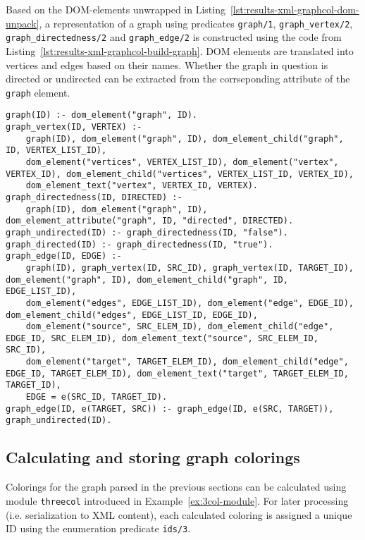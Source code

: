 Based on the DOM-elements unwrapped in Listing~\ref{lst:results-xml-graphcol-dom-unpack}, a representation of a graph using predicates \texttt{graph/1}, \texttt{graph\_vertex/2}, \texttt{graph\_directedness/2} and \texttt{graph\_edge/2} is constructed using the code from Listing~\ref{lst:results-xml-graphcol-build-graph}. DOM elements are translated into vertices and edges based on their names. Whether the graph in question is directed or undirected can be extracted from the corrseponding attribute of the \texttt{graph} element.

\begin{lstlisting}[style=asp-code, label={lst:results-xml-graphcol-build-graph}, caption={Constructing a graph representation from parsed XML data.}]
% Translate generic DOM-elements into graphs
graph(ID) :- dom_element("graph", ID).
graph_vertex(ID, VERTEX) :- 
    graph(ID), dom_element("graph", ID), dom_element_child("graph", ID, VERTEX_LIST_ID), 
    dom_element("vertices", VERTEX_LIST_ID), dom_element("vertex", VERTEX_ID), dom_element_child("vertices", VERTEX_LIST_ID, VERTEX_ID),
    dom_element_text("vertex", VERTEX_ID, VERTEX).
graph_directedness(ID, DIRECTED) :- 
    graph(ID), dom_element("graph", ID), dom_element_attribute("graph", ID, "directed", DIRECTED).
graph_undirected(ID) :- graph_directedness(ID, "false").
graph_directed(ID) :- graph_directedness(ID, "true").
graph_edge(ID, EDGE) :- 
    graph(ID), graph_vertex(ID, SRC_ID), graph_vertex(ID, TARGET_ID), dom_element("graph", ID), dom_element_child("graph", ID, EDGE_LIST_ID), 
    dom_element("edges", EDGE_LIST_ID), dom_element("edge", EDGE_ID), dom_element_child("edges", EDGE_LIST_ID, EDGE_ID),
    dom_element("source", SRC_ELEM_ID), dom_element_child("edge", EDGE_ID, SRC_ELEM_ID), dom_element_text("source", SRC_ELEM_ID, SRC_ID),
    dom_element("target", TARGET_ELEM_ID), dom_element_child("edge", EDGE_ID, TARGET_ELEM_ID), dom_element_text("target", TARGET_ELEM_ID, TARGET_ID),
    EDGE = e(SRC_ID, TARGET_ID).
graph_edge(ID, e(TARGET, SRC)) :- graph_edge(ID, e(SRC, TARGET)), graph_undirected(ID).	    
\end{lstlisting}    

\subsection{Calculating and storing graph colorings}

Colorings for the graph parsed in the previous sections can be calculated using module \texttt{threecol} introduced in Example~\ref{ex:3col-module}. For later processing (i.e. serialization to XML content), each calculated coloring is assigned a unique ID using the enumeration predicate \texttt{ids/3}.

